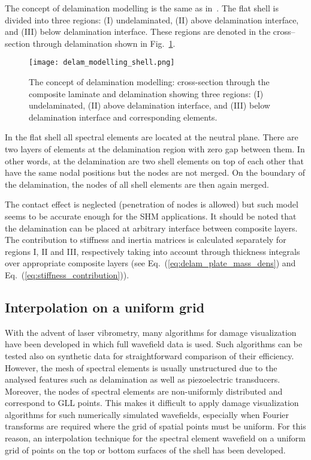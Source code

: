 \documentclass[preprint,12pt]{elsarticle}
\begin{document}
	The concept of delamination modelling is the same as in~\cite{Kudela2009}. The flat shell is divided into three regions: (I) undelaminated, (II) above delamination interface, and (III) below delamination interface. These regions are denoted in the cross--section through delamination shown in Fig.~\ref{fig:delam_modelling_shell}. 
	\begin{figure} [h!]
		\centering
		\texttt{[image: delam\_modelling\_shell.png]}	
		\caption{The concept of delamination modelling: cross-section through the composite laminate and delamination showing three regions: (I) undelaminated, (II) above delamination interface, and (III) below delamination interface and corresponding elements.}
		\label{fig:delam_modelling_shell}
	\end{figure}
	In the flat shell all spectral elements are located at the neutral plane. There are two layers of elements at the delamination region with zero gap between them. In other words, at the delamination are two shell elements on top of each other that have the same nodal positions but the nodes are not merged. On the boundary of the delamination, the nodes of all shell elements are then again merged.

	The contact effect is neglected (penetration of nodes is allowed) but such model seems to be accurate enough for the SHM applications. It should be noted that the delamination can be placed at arbitrary interface between composite layers. The contribution to stiffness and inertia matrices is calculated separately for regions I, II and III, respectively taking into account through thickness integrals over appropriate composite layers (see Eq.~(\ref{eq:delam_plate_mass_dens}) and Eq.~(\ref{eq:stiffness_contribution})).
	
	\subsection{Interpolation on a uniform grid}
	
	With the advent of laser vibrometry, many algorithms for damage visualization have been developed in which full wavefield data is used. Such algorithms can be tested also on synthetic data for straightforward comparison of their efficiency. However, the mesh of spectral elements is usually unstructured due to the analysed features such as delamination as well as piezoelectric transducers. Moreover, the nodes of spectral elements are non-uniformly distributed and correspond to GLL points. This makes it difficult to apply damage visualization algorithms for such numerically simulated wavefields, especially when Fourier transforms are required where the grid of spatial points must be uniform. For this reason, an interpolation technique for the spectral element wavefield on a uniform grid of points on the top or bottom surfaces of the shell has been developed. 
	
\end{document}
